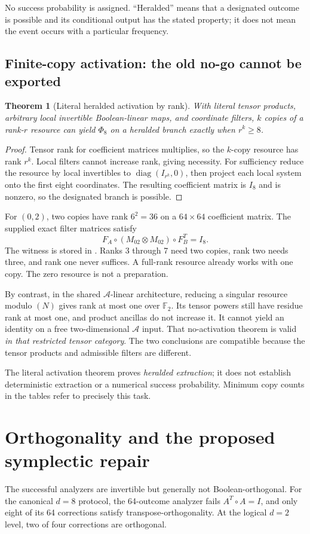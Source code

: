 \documentclass[11pt,a4paper]{article}
\newtheorem{theorem}{Theorem}[section]
\theoremstyle{definition}\newtheorem{definition}[theorem]{Definition}
\newcommand{\F}{\mathbb F_2}
\newcommand{\A}{\mathcal A}
\newcommand{\file}[1]{\path{#1}}
\begin{document}
No success probability is assigned. ``Heralded'' means that a designated outcome is possible and its conditional output has the stated property; it does not mean the event occurs with a particular frequency.

\subsection{Finite-copy activation: the old no-go cannot be exported}
\begin{theorem}[Literal heralded activation by rank]
With literal tensor products, arbitrary local invertible Boolean-linear maps, and coordinate filters, $k$ copies of a rank-$r$ resource can yield $\Phi_8$ on a heralded branch exactly when $r^k\ge8$.
\end{theorem}
\begin{proof}
Tensor rank for coefficient matrices multiplies, so the $k$-copy resource has rank $r^k$. Local filters cannot increase rank, giving necessity. For sufficiency reduce the resource by local invertibles to $\operatorname{diag}(I_{r^k},0)$, then project each local system onto the first eight coordinates. The resulting coefficient matrix is $I_8$ and is nonzero, so the designated branch is possible.
\end{proof}
For $(0,2)$, two copies have rank $6^2=36$ on a $64\times64$ coefficient matrix. The supplied exact filter matrices satisfy
\[
 F_A\circ(M_{02}\otimes M_{02})\circ F_B^T=I_8.
\]
The witness is stored in \file{data/literal_activation_witness.json}. Ranks 3 through 7 need two copies, rank two needs three, and rank one never suffices. A full-rank resource already works with one copy. The zero resource is not a preparation.

By contrast, in the shared $\A$-linear architecture, reducing a singular resource modulo $(N)$ gives rank at most one over $\F$. Its tensor powers still have residue rank at most one, and product ancillas do not increase it. It cannot yield an identity on a free two-dimensional $\A$ input. That no-activation theorem is valid \emph{in that restricted tensor category}. The two conclusions are compatible because the tensor products and admissible filters are different.

The literal activation theorem proves \emph{heralded extraction}; it does not establish deterministic extraction or a numerical success probability. Minimum copy counts in the tables refer to precisely this task.

\section{Orthogonality and the proposed symplectic repair}
The successful analyzers are invertible but generally not Boolean-orthogonal. For the canonical $d=8$ protocol, the 64-outcome analyzer fails $A^T\circ A=I$, and only eight of its 64 corrections satisfy transpose-orthogonality. At the logical $d=2$ level, two of four corrections are orthogonal.
\end{document}
